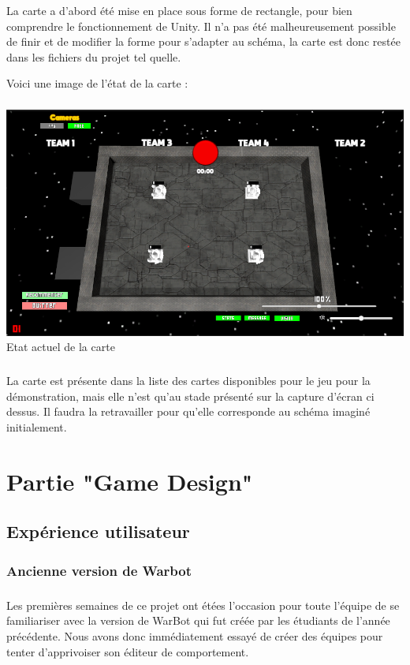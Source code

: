 \documentclass{report}
\begin{document}
La carte a d'abord été mise en place sous forme de rectangle, pour bien comprendre le fonctionnement de Unity. Il  n’a pas été malheureusement possible de finir et de modifier la forme pour s’adapter au schéma, la carte est donc restée dans les fichiers du projet tel quelle.

Voici une image de l’état de la carte : 

\paragraph{}
\begin{center}
\includegraphics[scale=0.5]{DATA/space.png}
 {Etat actuel de la carte}
\end{center}
\paragraph{}

La carte est présente dans la liste des cartes disponibles pour le jeu pour la démonstration, mais elle n’est qu’au stade présenté sur la capture d’écran ci dessus. Il faudra la retravailler pour qu’elle corresponde au schéma imaginé initialement.

\newpage
\chapter{Partie "Game Design"}
\section{Expérience utilisateur}
\subsection{Ancienne version de Warbot}
\paragraph{}
    Les premières semaines de ce projet ont étées l’occasion pour toute l’équipe de se familiariser avec la version de WarBot qui fut créée par les étudiants de l’année précédente. Nous avons donc immédiatement essayé de créer des équipes pour tenter d’apprivoiser son éditeur de comportement.
\end{document}
